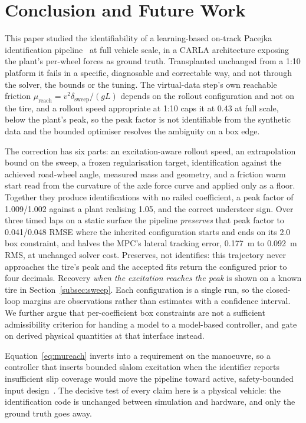 \section{Conclusion and Future Work}
\label{sec:conclusion}

This paper studied the identifiability of a learning-based on-track Pacejka
identification pipeline~\cite{ontrack2025} at full vehicle scale, in a CARLA
architecture exposing the plant's per-wheel forces as ground truth.
Transplanted unchanged from a 1:10 platform it fails in a specific, diagnosable
and correctable way, and not through the solver, the bounds or the tuning. The
virtual-data step's own reachable friction
$\mu_{\mathrm{reach}}=v^{2}\delta_{\mathrm{sweep}}/(gL)$ depends on the rollout
configuration and not on the tire, and a rollout speed appropriate at 1:10 caps
it at \num{0.43} at full scale, below the plant's peak, so the peak factor is
not
identifiable from the synthetic data and the bounded optimiser resolves the
ambiguity on a box edge.

The correction has six parts: an excitation-aware rollout speed, an
extrapolation bound on the sweep, a frozen regularisation target,
identification against the achieved road-wheel angle, measured mass and
geometry, and a friction warm start read from the curvature of the axle force
curve and applied only as a floor. Together they produce identifications with
no railed coefficient, a peak factor of \num{1.009}/\num{1.002} against a plant
realising \num{1.05}, and the correct understeer sign. Over three timed laps on
a static surface the pipeline \emph{preserves} that peak factor to
\num{0.041}/\num{0.048} RMSE where the inherited configuration starts and ends
on its \num{2.0} box constraint, and halves the MPC's lateral tracking error,
\SI{0.177}{\meter} to \SI{0.092}{\meter} RMS, at unchanged solver cost.
Preserves, not identifies: this trajectory never approaches the tire's peak and
the accepted fits return the configured prior to four decimals. Recovery
\emph{when the excitation reaches the peak} is shown on a known tire in
Section~\ref{subsec:sweep}. Each configuration is a single run, so the
closed-loop margins are observations rather than estimates with a confidence
interval. We further argue that per-coefficient box constraints are not a
sufficient admissibility criterion for handing a model to a model-based
controller, and gate on derived physical quantities at that interface
instead.

Equation~\eqref{eq:mureach} inverts into a requirement on the manoeuvre, so a
controller that inserts bounded slalom excitation when the identifier reports
insufficient slip coverage would move the pipeline toward active,
safety-bounded input design~\cite{goodwin1977design}. The decisive test of
every claim here is a physical vehicle: the identification code is unchanged
between simulation and hardware, and only the ground truth goes away.
